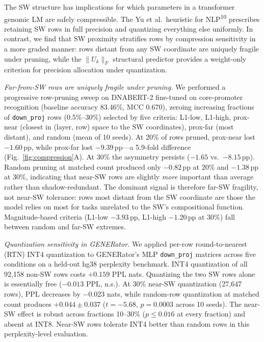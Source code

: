 \documentclass[11pt]{article}
\begin{document}
The SW structure has implications for which parameters in a
transformer genomic LM are safely compressible. The Yu et al.\
heuristic for NLP\textsuperscript{10} prescribes retaining SW rows
in full precision and quantizing everything else uniformly. In
contrast, we find that SW proximity stratifies rows by compression
sensitivity in a more graded manner: rows distant from any SW
coordinate are uniquely fragile under pruning, while the $\|U_k\|_F$
structural predictor provides a weight-only criterion for precision
allocation under quantization.

\textit{Far-from-SW rows are uniquely fragile under pruning.}
We performed a progressive row-pruning sweep on DNABERT-2 fine-tuned
on core-promoter recognition (baseline accuracy 83.46\%, MCC
0.670), zeroing increasing fractions of \texttt{down\_proj} rows
(0.5\%--30\%) selected by five criteria: L1-low, L1-high, prox-near
(closest in (layer, row) space to the SW coordinates), prox-far
(most distant), and random (mean of 10 seeds). At 20\% of rows
pruned, prox-near lost $-1.60$\,pp, while prox-far lost
$-9.39$\,pp---a 5.9-fold difference (Fig.~\ref{fig:compression}A).
At 30\% the asymmetry persists ($-1.65$ vs.\ $-8.15$\,pp). Random
pruning at matched count produced only $-0.82$\,pp at 20\% and
$-1.38$\,pp at 30\%, indicating that near-SW rows are slightly
\emph{more} important than average rather than shadow-redundant.
The dominant signal is therefore far-SW fragility, not near-SW
tolerance: rows most distant from the SW coordinate are those the
model relies on most for tasks unrelated to the SW's compositional
function. Magnitude-based criteria (L1-low $-3.93$\,pp, L1-high
$-1.20$\,pp at 30\%) fall between random and far-SW extremes.

\textit{Quantization sensitivity in GENERator.}
We applied per-row round-to-nearest (RTN) INT4 quantization to
GENERator's MLP \texttt{down\_proj} matrices across five conditions
on a held-out hg38 perplexity benchmark. INT4 quantization of all
92{,}158 non-SW rows costs $+0.159$ PPL nats. Quantizing the two SW
rows alone is essentially free ($-0.013$ PPL, n.s.). At 30\%
near-SW quantization (27{,}647 rows), PPL decreases by $-0.023$
nats, while random-row quantization at matched count produces
$+0.044 \pm 0.037$ ($t = -5.68$, $p = 0.0003$ across 10 seeds). The
near-SW effect is robust across fractions 10--30\% ($p \leq 0.016$
at every fraction) and absent at INT8. Near-SW rows tolerate INT4
better than random rows in this perplexity-level evaluation.
\end{document}

